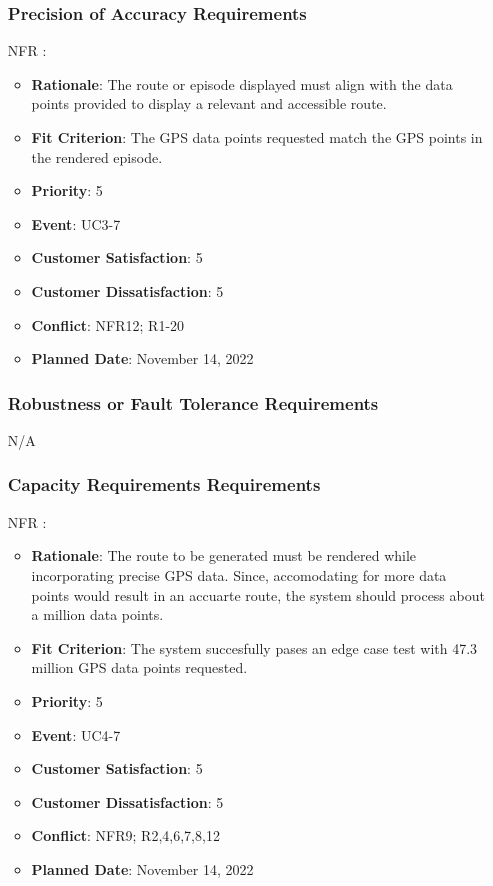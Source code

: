 \documentclass[12pt, titlepage]{article}
\newcounter{reqnum} %
\newcounter{freqnum} %
\begin{document}
\begin{itemize}
\subsubsection{Precision of Accuracy Requirements}
\item[NFR\refstepcounter{freqnum}\thefreqnum
\label{NFR}:] 
\begin{itemize}
    \item \textbf{Rationale}: The route or episode displayed must align with the data points provided to display a relevant and accessible route.
    \item \textbf{Fit Criterion}: The GPS data points requested match the GPS points in the rendered episode.
    \item \textbf{Priority}: 5
    \item \textbf{Event}: UC3-7%
    \item \textbf{Customer Satisfaction}: 5
    \item \textbf{Customer Dissatisfaction}: 5
    \item \textbf{Conflict}: NFR12; R1-20
    \item \textbf{Planned Date}: November 14, 2022
\end{itemize}
\subsubsection{Robustness or Fault Tolerance Requirements}
N/A
\subsubsection{Capacity Requirements Requirements}
\item[NFR\refstepcounter{freqnum}\thefreqnum
\label{NFR}:] 
\begin{itemize}
    \item \textbf{Rationale}: The route to be generated must be rendered while incorporating precise GPS data. Since, accomodating for more data points would result in an accuarte route, the system should process about a million data points.
    \item \textbf{Fit Criterion}: The system succesfully pases an edge case test with 47.3 million GPS data points requested.
    \item \textbf{Priority}: 5
    \item \textbf{Event}: UC4-7 %
    \item \textbf{Customer Satisfaction}: 5
    \item \textbf{Customer Dissatisfaction}: 5
    \item \textbf{Conflict}: NFR9; R2,4,6,7,8,12
    \item \textbf{Planned Date}: November 14, 2022
\end{itemize}

\end{itemize}
\end{document}
